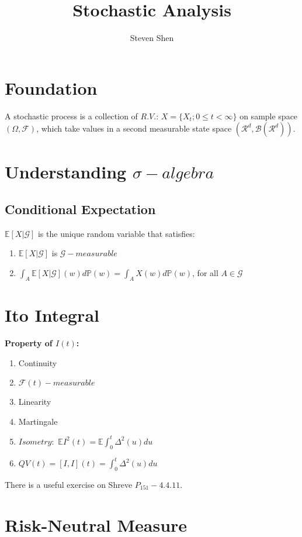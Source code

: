 \documentclass[a4paper, 12pt]{article}
\title{\textbf{Stochastic Analysis}}
\author{Steven Shen}
\begin{document}
\maketitle

\section{Foundation}
A stochastic process is a collection of $R.V.$: $X = \{X_t; 0 \leq t < \infty\}$ on sample space $(\Omega, \mathcal{F})$, which take values in a second measurable state space $(\mathcal{R}^d, \mathcal{B}(\mathcal{R}^d))$.

\section{Understanding $\sigma-algebra$}

\subsection{Conditional Expectation}
$\mathbb{E}[X|\mathcal{G}]$ is the unique random variable that satisfies:
\begin{enumerate}
	\item $\mathbb{E}[X|\mathcal{G}]$ is $\mathcal{G}-measurable$
	\item $\int_A \mathbb{E}[X|\mathcal{G}](w) d\mathbb{P}(w) = \int_A X(w) d\mathbb{P}(w)$, for all $A \in \mathcal{G}$
\end{enumerate}

\section{Ito Integral}
\textbf{Property of $I(t)$: }
\begin{enumerate}
	\item Continuity
	\item $\mathcal{F}(t)-measurable$
	\item Linearity
	\item Martingale
	\item $Isometry:$ $\mathbb{E}I^2(t) = \mathbb{E}\int^t_0{\Delta^2(u) du}$
	\item $QV(t) = [I, I](t) = \int^t_0{\Delta^2(u) du}$ 
\end{enumerate}

\indent There is a useful exercise on Shreve $P_{151} - 4.4.11$.

\section{Risk-Neutral Measure}
\end{document}
